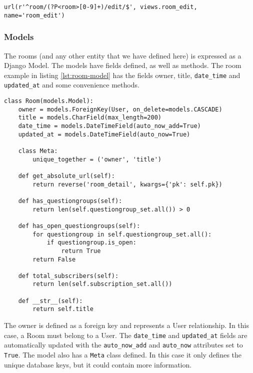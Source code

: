 \begin{lstlisting}[caption=URL Pattern for Room Edit, label=lst:urlpattern-for-room-edit]
url(r'^room/(?P<room>[0-9]+)/edit/$', views.room_edit, name='room_edit')
\end{lstlisting}

\subsubsection*{Models}
The rooms (and any other entity that we have defined here) is expressed as a Django Model.  
The models have fields defined, as well as methods. The room example in listing \ref{lst:room-model} has the fields owner, title, \texttt{date\_time} and \texttt{updated\_at} and some convenience methods.

\begin{lstlisting}[caption=The Room Model, label=lst:room-model]
class Room(models.Model):
    owner = models.ForeignKey(User, on_delete=models.CASCADE)
    title = models.CharField(max_length=200)
    date_time = models.DateTimeField(auto_now_add=True)
    updated_at = models.DateTimeField(auto_now=True)

    class Meta:
        unique_together = ('owner', 'title')

    def get_absolute_url(self):
        return reverse('room_detail', kwargs={'pk': self.pk})

    def has_questiongroups(self):
        return len(self.questiongroup_set.all()) > 0

    def has_open_questiongroups(self):
        for questiongroup in self.questiongroup_set.all():
            if questiongroup.is_open:
                return True
        return False

    def total_subscribers(self):
        return len(self.subscription_set.all())

    def __str__(self):
        return self.title
\end{lstlisting}

The owner is defined as a foreign key and represents a User relationship. In this case, a Room must belong to a User. The \texttt{date\_time} and \texttt{updated\_at} fields are automatically updated with the \texttt{auto\_now\_add} and \texttt{auto\_now} attributes set to \texttt{True}. The model also has a \texttt{Meta} class defined. In this case it only defines the unique database keys, but it could contain more information.

